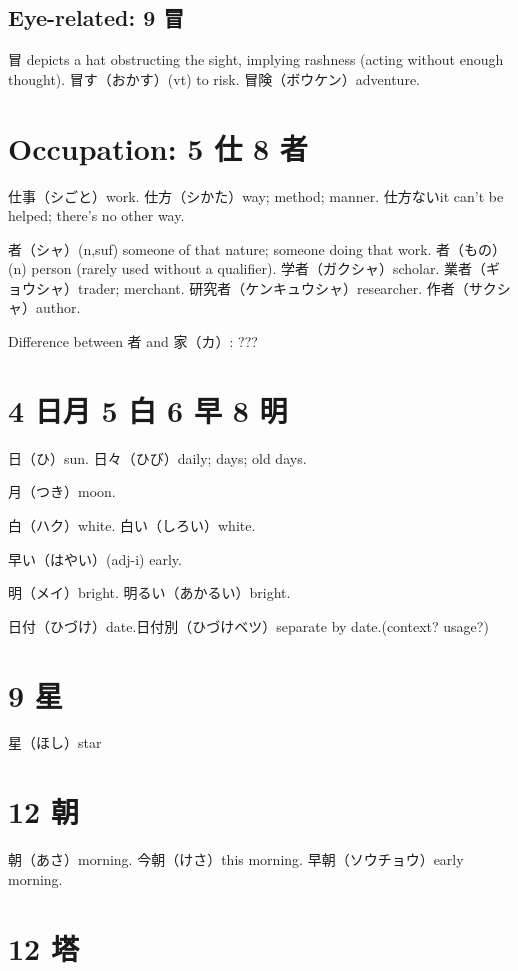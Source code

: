 \subsection{Eye-related: 9 冒}

冒 depicts a hat obstructing the sight, implying rashness
(acting without enough thought).
冒す（おかす）(vt) to risk.
冒険（ボウケン）adventure.

\section{Occupation: 5 仕 8 者}

仕事（シごと）work.
仕方（シかた）way; method; manner.
仕方ないit can't be helped; there's no other way.

者（シャ）(n,suf) someone of that nature; someone doing that work.
者（もの）(n) person (rarely used without a qualifier).
学者（ガクシャ）scholar.
業者（ギョウシャ）trader; merchant.
研究者（ケンキュウシャ）researcher.
作者（サクシャ）author.

Difference between 者 and 家（カ）: ???

\section{4 日月 5 白 6 早 8 明}

日（ひ）sun.
日々（ひび）daily; days; old days.

月（つき）moon.

白（ハク）white.
白い（しろい）white.

早い（はやい）(adj-i) early.

明（メイ）bright.
明るい（あかるい）bright.

日付（ひづけ）date.日付別（ひづけベツ）separate by date.(context? usage?)

\section{9 星}

星（ほし）star

\section{12 朝}

朝（あさ）morning.
今朝（けさ）this morning.
早朝（ソウチョウ）early morning.

\section{12 塔}

